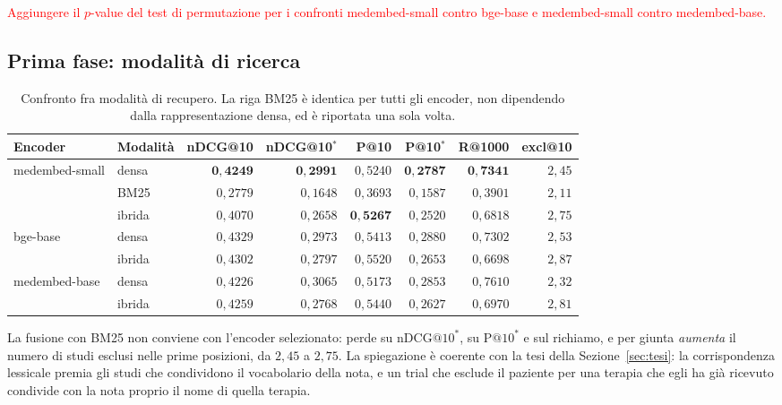 \documentclass[pdflatex,sn-mathphys-num]{sn-jnl}
\theoremstyle{thmstyleone}
\theoremstyle{thmstyletwo}
\theoremstyle{thmstylethree}
\newcommand{\ev}[1]{\textcolor{red}{#1}}
\begin{document}
\ev{Aggiungere il $p$-value del test di permutazione per i confronti medembed-small contro bge-base e medembed-small contro medembed-base.}

\subsection{Prima fase: modalità di ricerca}\label{sec:res-modalita}

\begin{table}[H]
\centering
\begin{tabular}{llrrrrrr}
\toprule
Encoder & Modalità & nDCG@10 & nDCG@10$^{*}$ & P@10 & P@10$^{*}$ & R@1000 & excl@10 \\
\midrule
\multirow{3}{*}{medembed-small}
 & densa   & $\mathbf{0{,}4249}$ & $\mathbf{0{,}2991}$ & $0{,}5240$ & $\mathbf{0{,}2787}$ & $\mathbf{0{,}7341}$ & $2{,}45$ \\
 & BM25    & $0{,}2779$ & $0{,}1648$ & $0{,}3693$ & $0{,}1587$ & $0{,}3901$ & $2{,}11$ \\
 & ibrida  & $0{,}4070$ & $0{,}2658$ & $\mathbf{0{,}5267}$ & $0{,}2520$ & $0{,}6818$ & $2{,}75$ \\
\midrule
\multirow{2}{*}{bge-base}
 & densa   & $0{,}4329$ & $0{,}2973$ & $0{,}5413$ & $0{,}2880$ & $0{,}7302$ & $2{,}53$ \\
 & ibrida  & $0{,}4302$ & $0{,}2797$ & $0{,}5520$ & $0{,}2653$ & $0{,}6698$ & $2{,}87$ \\
\midrule
\multirow{2}{*}{medembed-base}
 & densa   & $0{,}4226$ & $0{,}3065$ & $0{,}5173$ & $0{,}2853$ & $0{,}7610$ & $2{,}32$ \\
 & ibrida  & $0{,}4259$ & $0{,}2768$ & $0{,}5440$ & $0{,}2627$ & $0{,}6970$ & $2{,}81$ \\
\bottomrule
\end{tabular}
\caption{Confronto fra modalità di recupero. La riga BM25 è identica per tutti gli encoder, non dipendendo dalla rappresentazione densa, ed è riportata una sola volta.}
\label{tab:modalita}
\end{table}

La fusione con BM25 non conviene con l'encoder selezionato: perde su $\mathrm{nDCG@}10^{*}$, su $\mathrm{P@}10^{*}$ e sul richiamo, e per giunta \emph{aumenta} il numero di studi esclusi nelle prime posizioni, da $2{,}45$ a $2{,}75$. La spiegazione è coerente con la tesi della Sezione~\ref{sec:tesi}: la corrispondenza lessicale premia gli studi che condividono il vocabolario della nota, e un trial che esclude il paziente per una terapia che egli ha già ricevuto condivide con la nota proprio il nome di quella terapia.
\end{document}
